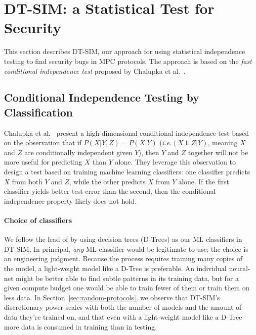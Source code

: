 \documentclass[acmlarge, manuscript, screen, review, anonymous, table]{acmart}
\newcommand{\ie}{\textit{i.e.}\xspace}
\newcommand{\toolname}{\textsc{DT-SIM}\xspace}
\begin{document}
\section{\toolname: a Statistical Test for Security}

This section describes \toolname, our approach for using statistical independence testing to find security bugs in MPC protocols. The approach is based on the \emph{fast conditional independence test} proposed by Chalupka et al.~\cite{chalupka2018fast}.

\subsection{Conditional Independence Testing by Classification}

Chalupka et al.~\cite{chalupka2018fast} present a high-dimensional conditional independence test
based on the observation that if $P(X | Y, Z) = P(X | Y)$
(\ie $(X ⫫ Z | Y)$, meaning $X$ and $Z$ are conditionally independent given $Y$),
then $Y$ and $Z$ together will not be more useful for predicting $X$ than $Y$ alone.
They leverage this observation to design a test based on training machine learning classifiers:
one classifier predicts $X$ from both $Y$ and $Z$, while the other predicts $X$ from $Y$ alone.
If the first classifier yields better test error than the second,
then the conditional independence property likely does not hold.

\paragraph{Choice of classifiers}
We follow the lead of \cite{chalupka2018fast} by using decision trees (D-Trees) as our ML classifiers in \toolname.
In principal, \emph{any} ML classifier would be legitimate to use;
the choice is an engineering judgment.
Because the process requires training many copies of the model, a light-weight model like a D-Tree is preferable.
An individual neural-net might be better able to find subtle patterns in its training data,
but for a given compute budget one would be able to train fewer of them or train them on less data.
In Section~\ref{sec:random-protocols}, we observe that \toolname's discretionary power scales with both the number of models
and the amount of data they're trained on,
and that even with a light-weight model like a D-Tree more data is consumed in training than in testing.
\end{document}
